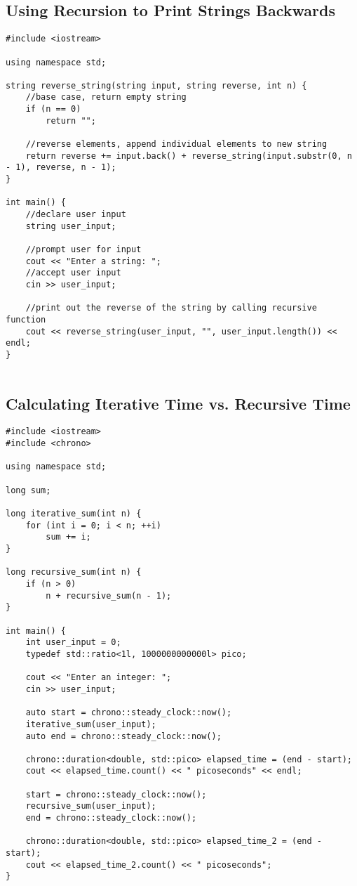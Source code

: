 \documentclass[11pt]{article}
\begin{document}
\subsection*{Using Recursion to Print Strings Backwards}
\begin{lstlisting}
#include <iostream>

using namespace std;

string reverse_string(string input, string reverse, int n) {
    //base case, return empty string
    if (n == 0)
        return "";

    //reverse elements, append individual elements to new string
    return reverse += input.back() + reverse_string(input.substr(0, n - 1), reverse, n - 1);
}

int main() {
    //declare user input
    string user_input;

    //prompt user for input
    cout << "Enter a string: ";
    //accept user input
    cin >> user_input;

    //print out the reverse of the string by calling recursive function
    cout << reverse_string(user_input, "", user_input.length()) << endl;
}


\end{lstlisting}


\subsection*{Calculating Iterative Time vs. Recursive Time}
\begin{lstlisting}
#include <iostream>
#include <chrono>

using namespace std;

long sum;

long iterative_sum(int n) {
    for (int i = 0; i < n; ++i)
        sum += i;
}

long recursive_sum(int n) {
    if (n > 0)
        n + recursive_sum(n - 1);
}

int main() {
    int user_input = 0;
    typedef std::ratio<1l, 1000000000000l> pico;

    cout << "Enter an integer: ";
    cin >> user_input;

    auto start = chrono::steady_clock::now();
    iterative_sum(user_input);
    auto end = chrono::steady_clock::now();

    chrono::duration<double, std::pico> elapsed_time = (end - start);
    cout << elapsed_time.count() << " picoseconds" << endl;

    start = chrono::steady_clock::now();
    recursive_sum(user_input);
    end = chrono::steady_clock::now();

    chrono::duration<double, std::pico> elapsed_time_2 = (end - start);
    cout << elapsed_time_2.count() << " picoseconds";
}

\end{lstlisting}
\end{document}
